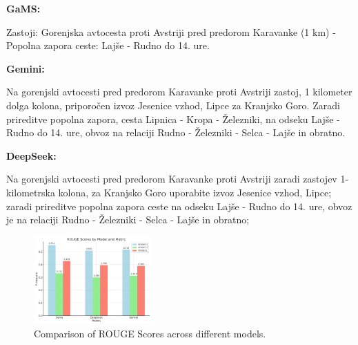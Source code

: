\documentclass[fleqn,moreauthors,10pt]{ds_report}
\begin{document}
\vspace{0.3cm} %

\noindent
\textbf{GaMS:}
\begin{scriptsize}
Zastoji: Gorenjska avtocesta proti Avstriji pred predorom Karavanke (1 km) - Popolna zapora ceste: Lajše - Rudno do 14. ure.
\par
\end{scriptsize}

\vspace{0.3cm} %

\noindent
\textbf{Gemini:}
\begin{scriptsize}
Na gorenjski avtocesti pred predorom Karavanke proti Avstriji zastoj, 1 kilometer dolga kolona, priporočen izvoz Jesenice vzhod, Lipce za Kranjsko Goro. Zaradi prireditve popolna zapora, cesta Lipnica - Kropa - Železniki, na odseku Lajše - Rudno do 14. ure, obvoz na relaciji Rudno - Železniki - Selca - Lajše in obratno.
\par
\end{scriptsize}

\vspace{0.3cm} %

\noindent
\textbf{DeepSeek:}
\begin{scriptsize}
Na gorenjski avtocesti pred predorom Karavanke proti Avstriji zaradi zastojev 1-kilometrska kolona, za Kranjsko Goro uporabite izvoz Jesenice vzhod, Lipce; zaradi prireditve popolna zapora ceste na odseku Lajše - Rudno do 14. ure, obvoz je na relaciji Rudno - Železniki - Selca - Lajše in obratno;
\par
\end{scriptsize}


\begin{figure}[htbp] %
    \centering
    \includegraphics[width=0.40\textwidth]{report/fig/output.png} %
    \caption{Comparison of ROUGE Scores across different models.}
    \label{fig:rouge_scores}
\end{figure}
\end{document}

